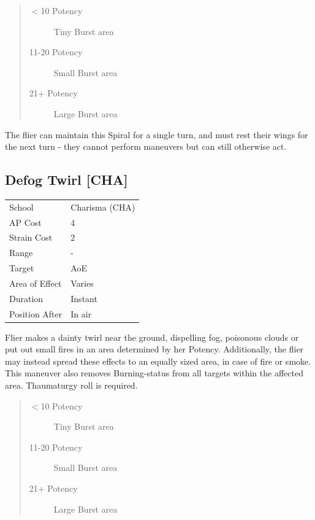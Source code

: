\documentclass[11pt,a4paper,twocolumn]{book}
\begin{document}
\begin{quote}
  \begin{description}
    \item[$<$10 Potency] 	Tiny Burst area
    \item[11-20 Potency] 	Small Burst area
    \item[21+ Potency] 	Large Burst area
  \end{description}
\end{quote}

The flier can maintain this Spiral for a single turn, and must rest their wings for the next turn - they cannot perform maneuvers but can still otherwise act.

\vfill


\subsection*{Defog Twirl [CHA]}
{
	\begin{tabu} to 75mm{| X[l,4] | X[l,7] |}
		\hline
		School 			& Charisma (CHA) 	\\
        AP Cost	      	& 4			 		\\
        Strain Cost     & 2 				\\
        Range     		& - 				\\
        Target      	& AoE 				\\
        Area of Effect  & Varies 		 	\\
        Duration     	& Instant 	 		\\
		Position After  & In air 			\\ \hline
	\end{tabu}
		
}

\medskip

Flier makes a dainty twirl near the ground, dispelling fog, poisonous clouds or put out small fires in an area determined by her Potency. Additionally, the flier may instead spread these effects to an equally sized area, in case of fire or smoke. This maneuver also removes Burning-status from all targets within the affected area. Thaumaturgy roll is required.

\begin{quote}
  \begin{description}
    \item[$<$10 Potency] 	Tiny Burst area
    \item[11-20 Potency] 	Small Burst area
    \item[21+ Potency] 	Large Burst area
  \end{description}
\end{quote}
\end{document}
